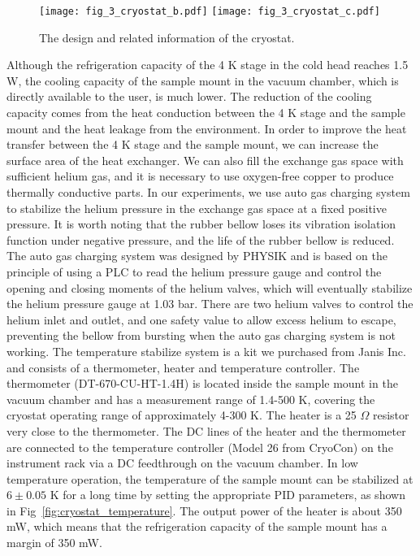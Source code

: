 \begin{figure}
    \centering
    {\texttt{[image: fig\_3\_cryostat\_b.pdf]}}
    {\texttt{[image: fig\_3\_cryostat\_c.pdf]}}
    \caption{The design and related information of the cryostat.}
    \label{fig:cryostat}
\end{figure}

Although the refrigeration capacity of the 4 K stage in the cold head reaches 1.5 W, the cooling capacity of the sample mount in the vacuum chamber, which is directly available to the user, is much lower. The reduction of the cooling capacity comes from the heat conduction between the 4 K stage and the sample mount and the heat leakage from the environment. In order to improve the heat transfer between the 4 K stage and the sample mount, we can increase the surface area of the heat exchanger. We can also fill the exchange gas space with sufficient helium gas, and it is necessary to use oxygen-free copper to produce thermally conductive parts. In our experiments, we use auto gas charging system to stabilize the helium pressure in the exchange gas space at a fixed positive pressure. It is worth noting that the rubber bellow loses its vibration isolation function under negative pressure, and the life of the rubber bellow is reduced. The auto gas charging system was designed by PHYSIK and is based on the principle of using a PLC to read the helium pressure gauge and control the opening and closing moments of the helium valves, which will eventually stabilize the helium pressure gauge at 1.03 bar. There are two helium valves to control the helium inlet and outlet, and one safety value to allow excess helium to escape, preventing the bellow from bursting when the auto gas charging system is not working. The temperature stabilize system is a kit we purchased from Janis Inc. and consists of a thermometer, heater and temperature controller. The thermometer (DT-670-CU-HT-1.4H) is located inside the sample mount in the vacuum chamber and has a measurement range of 1.4-500 K, covering the cryostat operating range of approximately 4-300 K. The heater is a 25 $\Omega$ resistor very close to the thermometer. The DC lines of the heater and the thermometer are connected to the temperature controller (Model 26 from CryoCon) on the instrument rack via a DC feedthrough on the vacuum chamber. In low temperature operation, the temperature of the sample mount can be stabilized at $6 \pm 0.05$ K for a long time by setting the appropriate PID parameters, as shown in Fig~\ref{fig:cryostat_temperature}. The output power of the heater is about 350 mW, which means that the refrigeration capacity of the sample mount has a margin of 350 mW.

